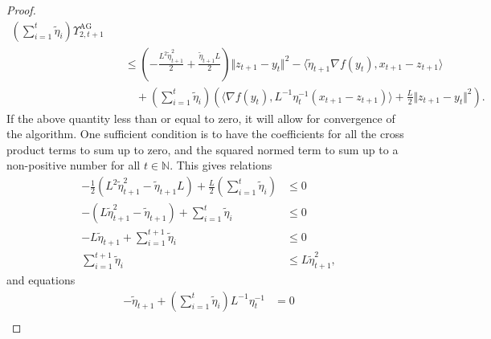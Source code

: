 \documentclass[12pt]{article}
\begin{document}
\begin{proof}
\begin{align*}
                \left(
                    \sum_{i = 1}^{t}\tilde \eta_i
                \right)\Upsilon_{2, t + 1}^{\text{AG}}
                \\
                &\quad \le 
                \left(
                    - \frac{L^2\tilde \eta_{t + 1}^2}{2}
                    + \frac{\tilde\eta_{t+1}L}{2}
                \right)
                \Vert z_{t+1} - y_t\Vert^2
                - 
                \langle \tilde \eta_{t+1} \nabla f(y_t), x_{t+1} - z_{t + 1}\rangle
                \\
                & \qquad + 
                \left(
                    \sum_{i = 1}^{t}\tilde \eta_i
                \right)\left(
                    \langle \nabla f(y_t), L^{-1}\eta_t^{-1}(x_{t+1} - z_{t + 1})\rangle
                    + \frac{L}{2}\Vert z_{t + 1} - y_t\Vert^2
                \right). 
            \end{align*}
            If the above quantity less than or equal to zero, it will allow for convergence of the algorithm. 
            One sufficient condition is to have the coefficients for all the cross product terms to sum up to zero, and the squared normed term to sum up to a non-positive number for all $t \in \mathbb N$. 
            This gives relations 
            \begin{align*}
                - \frac{1}{2}\left(
                    L^2 \tilde\eta_{t+1}^2 - \tilde\eta_{t+1}L 
                \right) + 
                \frac{L}{2}\left(
                    \sum_{i = 1}^{t} \tilde \eta_i
                \right) &\le 0
                \\
                - \left(
                    L\tilde \eta_{t + 1}^2 
                    - 
                    \tilde\eta_{t + 1}
                \right) + 
                \sum_{i = 1}^{t}\tilde \eta_i 
                &\le 0
                \\
                -L \tilde \eta_{t+1} + 
                \sum_{i = 1}^{t + 1} \tilde \eta_i 
                &\le 0
                \\
                \sum_{i = 1}^{t + 1}\tilde \eta_i 
                &\le L \tilde \eta_{t + 1}^2, 
            \end{align*}
            and equations 
            \begin{align*}
                -\tilde \eta_{t + 1} + 
                \left(
                    \sum_{i = 1}^{t}\tilde \eta_i
                \right)L^{-1}\eta_t^{-1} 
                &= 0
                \\

\end{align*}
\end{proof}
\end{document}
